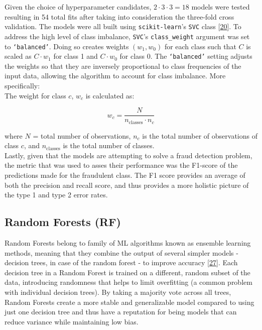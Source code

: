 \documentclass[11pt, oneside]{article}   	%
\begin{document}
Given the choice of hyperparameter candidates, $2 \cdot 3 \cdot 3 = 18$ models were tested resulting in 54 total fits after taking into consideration the three-fold cross validation. The models were all built using \texttt{scikit-learn}'s \texttt{SVC} class [\href{https://www.nature.com/articles/s41592-019-0686-2}{20}]. To address the high level of class imbalance, \texttt{SVC}'s \texttt{class\_weight} argument was set to \texttt{`balanced'}. Doing so creates weights $(w_1, w_0)$ for each class such that $C$ is scaled as $C \cdot w_1$ for class 1 and $C \cdot w_0$ for class 0. The \texttt{`balanced'} setting adjusts the weights so that they are inversely proportional to class frequencies of the input data, allowing the algorithm to account for class imbalance. More specifically:\\

The weight for class $c$, $w_c$ is calculated as:

\begin{equation}
w_c = \frac{N}{n_{\text{classes}}\cdot n_c}
\end{equation}

where $N$ = total number of observations, $n_c$ is the total number of observations of class  $c$, and $n_{\text{classes}}$ is the total number of classes. \\

Lastly, given that the models are attempting to solve a fraud detection problem, the metric that was used to asses their performance was the F1-score of the predictions made for the fraudulent class. The F1 score provides an average of both the precision and recall score, and thus provides a more holistic picture of the type 1 and type 2 error rates.  




\subsection{Random Forests (RF)}

Random Forests belong to family of ML algorithms known as ensemble learning methods, meaning that they combine the output of several simpler models - decision trees, in case of the random forest - to improve accuracy [\href{https://doi.org/10.1023/A:1010933404324}{27}]. Each decision tree in a Random Forest is trained on a different, random subset of the data, introducing randomness that helps to limit overfitting (a common problem with individual decision trees). By taking a majority vote across all trees, Random Forests create a more stable and generalizable model compared to using just one decision tree and thus have a reputation for being models that can reduce variance while maintaining low bias. \\
\end{document}
